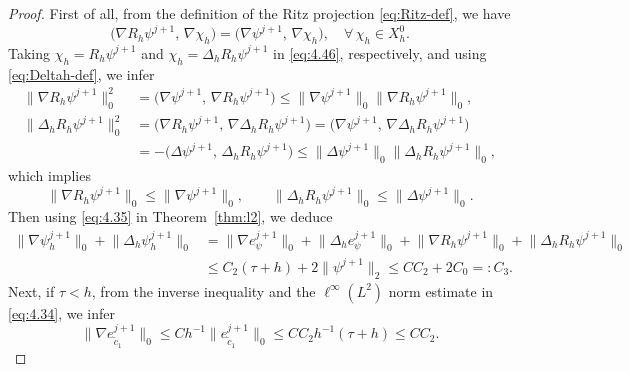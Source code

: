 \documentclass[a4paper,fleqn]{cas-sc}
\numberwithin{equation}{section}
\theoremstyle{definition}
\begin{document}
\begin{proof}
First of all, from the definition of the Ritz projection \eqref{eq:Ritz-def}, we have
\begin{equation}\label{eq:4.46}
  \bigl(\nabla R_{h}\psi^{j+1},\, \nabla\chi_{h}\bigr)
  = \bigl(\nabla\psi^{j+1},\, \nabla\chi_{h}\bigr), \quad \forall\,\chi_{h}\in X_{h}^{0}.
\end{equation}
Taking $\chi_{h} = R_{h}\psi^{j+1}$ and $\chi_{h} = \Delta_{h}R_{h}\psi^{j+1}$ in
\eqref{eq:4.46}, respectively, and using \eqref{eq:Deltah-def}, we infer
\begin{align}
  \bigl\|\nabla R_{h}\psi^{j+1}\bigr\|_{0}^{2}
  &= \bigl(\nabla\psi^{j+1},\, \nabla R_{h}\psi^{j+1}\bigr)
   \leq \bigl\|\nabla\psi^{j+1}\bigr\|_{0}\bigl\|\nabla R_{h}\psi^{j+1}\bigr\|_{0},
  \label{eq:4.47}\\[4pt]
  \bigl\|\Delta_{h}R_{h}\psi^{j+1}\bigr\|_{0}^{2}
  &= \bigl(\nabla R_{h}\psi^{j+1},\, \nabla\Delta_{h}R_{h}\psi^{j+1}\bigr)
   = \bigl(\nabla\psi^{j+1},\, \nabla\Delta_{h}R_{h}\psi^{j+1}\bigr)
  \nonumber\\
  &= -\bigl(\Delta\psi^{j+1},\, \Delta_{h}R_{h}\psi^{j+1}\bigr)
   \leq \bigl\|\Delta\psi^{j+1}\bigr\|_{0}\bigl\|\Delta_{h}R_{h}\psi^{j+1}\bigr\|_{0},
  \label{eq:4.48}
\end{align}
which implies
\begin{equation}\label{eq:4.49}
  \bigl\|\nabla R_{h}\psi^{j+1}\bigr\|_{0} \leq \bigl\|\nabla\psi^{j+1}\bigr\|_{0}, \qquad
  \bigl\|\Delta_{h}R_{h}\psi^{j+1}\bigr\|_{0} \leq \bigl\|\Delta\psi^{j+1}\bigr\|_{0}.
\end{equation}
Then using \eqref{eq:4.35} in Theorem~\ref{thm:l2}, we deduce
\begin{align}
  \bigl\|\nabla\psi_{h}^{j+1}\bigr\|_{0}
  + \bigl\|\Delta_{h}\psi_{h}^{j+1}\bigr\|_{0}
  &= \bigl\|\nabla e_{\psi}^{j+1}\bigr\|_{0}
   + \bigl\|\Delta_{h}e_{\psi}^{j+1}\bigr\|_{0}
   + \bigl\|\nabla R_{h}\psi^{j+1}\bigr\|_{0}
   + \bigl\|\Delta_{h}R_{h}\psi^{j+1}\bigr\|_{0}
  \nonumber\\
  &\leq C_{2}(\tau+h) + 2\bigl\|\psi^{j+1}\bigr\|_{2}
   \leq CC_{2} + 2C_{0} =: C_{3}.
  \label{eq:4.50}
\end{align}
Next, if $\tau < h$, from the inverse inequality and the $\ell^{\infty}(L^{2})$ norm estimate
in \eqref{eq:4.34}, we infer
\begin{equation}\label{eq:4.51}
  \bigl\|\nabla e_{\tilde{c}_{1}}^{j+1}\bigr\|_{0}
  \leq Ch^{-1}\bigl\|e_{\tilde{c}_{1}}^{j+1}\bigr\|_{0}
  \leq CC_{2}h^{-1}(\tau+h) \leq CC_{2}.

\end{equation}
\end{proof}
\end{document}
